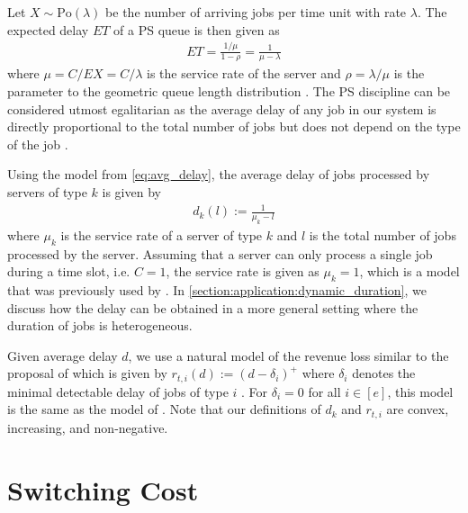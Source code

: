 Let $X \sim \text{Po}(\lambda)$ be the number of arriving jobs per time unit with rate $\lambda$. The expected delay $E T$ of a PS queue is then given as \begin{align}\label{eq:avg_delay}
    E T = \frac{1/\mu}{1-\rho} = \frac{1}{\mu - \lambda}
\end{align} where $\mu = C / E X = C / \lambda$ is the service rate of the server and $\rho = \lambda / \mu$ is the parameter to the geometric queue length distribution \cite{Virtamo2007}. The PS discipline can be considered utmost egalitarian as the average delay of any job in our system is directly proportional to the total number of jobs but does not depend on the type of the job \cite{Virtamo2007}.

Using the model from \autoref{eq:avg_delay}, the average delay of jobs processed by servers of type $k$ is given by \begin{align}\label{eq:delay}
    d_{k}(l) := \frac{1}{\mu_k - l}
\end{align} where $\mu_k$ is the service rate of a server of type $k$ and $l$ is the total number of jobs processed by the server. Assuming that a server can only process a single job during a time slot, i.e. $C = 1$, the service rate is given as $\mu_k = 1$, which is a model that was previously used by \citeauthor*{Lin2011} \cite{Lin2011, Lin2012}. In \autoref{section:application:dynamic_duration}, we discuss how the delay can be obtained in a more general setting where the duration of jobs is heterogeneous.

Given average delay $d$, we use a natural model of the revenue loss similar to the proposal of \citeauthor*{Lin2011} which is given by $r_{t,i}(d) := (d - \delta_i)^+$ where $\delta_i$ denotes the minimal detectable delay of jobs of type $i$ \cite{Lin2011}. For $\delta_i = 0$ for all $i \in [e]$, this model is the same as the model of \cite{Lin2012}. Note that our definitions of $d_k$ and $r_{t,i}$ are convex, increasing, and non-negative.

\section{Switching Cost}\label{section:application:switching_cost}

